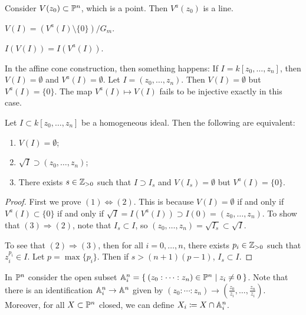 \documentclass[twoside, 10pt]{article}
\begin{document}
    \begin{exm}
        Consider $V(z_0) \subset \P^n$, which is a point. Then $V^a(z_0)$ is a line.
    \end{exm}

    \begin{rmk}
        $V(I) = (V^a(I) \setminus \{0\}) / G_m$.
    \end{rmk}

    \begin{rmk}
        $I(V(I)) = I(V^a(I))$.
    \end{rmk}

    \begin{rmk}
        In the affine cone construction, then something happens: If $I = k[z_0, \ldots, z_n]$, then $V(I) = \emptyset$ and $V^a(I) = \emptyset$. Let $I = (z_0, \ldots, z_n)$. Then $V(I) =\emptyset $ but $V^a(I) = \{0\}$. The map $V^a(I) \mapsto V(I)$ fails to be injective exactly in this case.
    \end{rmk}

    \begin{prop}
        Let $I \subset k[z_0, \ldots, z_n]$ be a homogeneous ideal. Then the following are equivalent:
        \begin{enumerate}
            \item $V(I) = \emptyset$;
            \item $\sqrt{I} \supset (z_0, \ldots, z_n)$;
            \item There exists $s \in \Z_{>0}$ such that $I \supset I_s$ and $V(I_s) = \emptyset$ but $V^a(I) = \{0\}$.
        \end{enumerate}
        \begin{proof}
            First we prove $(1) \Leftrightarrow (2)$. This is because $V(I) = \emptyset$ if and only if $V^a(I) \subset \{0\}$ if and only if $\sqrt{I} = I(V^a(I)) \supset I(0) = (z_0, \ldots, z_n)$. To show that $(3) \Rightarrow (2)$, note that $I_s \subset I$, so $(z_0, \ldots, z_n)=\sqrt{I_s} \subset \sqrt{I}$.

            To see that $(2) \Rightarrow (3)$, then for all $i = 0, \ldots, n$, there exists $p_i \in \Z_{> 0}$ such that $z_i^{p_i} \in I$. Let $p = \max\{p_i\}$. Then if $s > (n+1)(p-1)$, $I_s \subset I$.
        \end{proof}
    \end{prop}

    \begin{defn}
        In $\P^n$ consider the open subset $\A_i^n = \Set{(z_0:\cdots:z_n) \in \P^n | z_i \neq 0}$. Note that there is an identification $\A_i^n \to \A^n$ given by $(z_0:\cdots:z_n) \to \left( \frac{z_0}{z_i}, \ldots, \frac{z_n}{z_i} \right)$. Moreover, for all $X \subset \P^n$ closed, we can define $X_i \coloneqq X \cap \A_i^n$.
    \end{defn}
\end{document}
